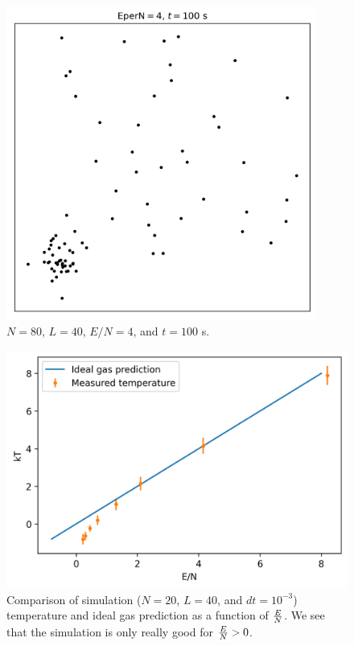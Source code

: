 \documentclass{article}
\begin{document}
\begin{figure}[H]
    \centering
    \includegraphics[width=4in]{homework8/p1b.png}
    \caption{$N=80$, $L=40$, $E/N=4$, and $t=100$ s.}
    \label{fig:1b}
\end{figure}

\bigskip
{}
\medskip

\begin{figure}[H]
    \centering
    \includegraphics[width=4.75in]{homework8/p2a.png}
    \caption{Comparison of simulation ($N=20$, $L=40$, and $dt=10^{-3}$) temperature and ideal gas prediction as a function of $E\over N$. We see that the simulation is only really good for ${E\over N} > 0$.}
    \label{fig:2a}
\end{figure}
\end{document}
